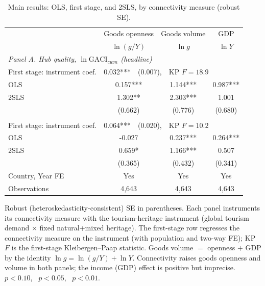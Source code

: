 \begin{table}[t]
\centering
\caption{Main results: OLS, first stage, and 2SLS, by connectivity measure (robust SE).}
\label{tab:main}
\begin{threeparttable}
\small
\begin{tabular}{lccc}
\toprule
 & Goods openness & Goods volume & GDP \\
 & $\ln(g/Y)$ & $\ln g$ & $\ln Y$ \\
\midrule
\multicolumn{4}{l}{\emph{Panel A. Hub quality, $\ln\mathrm{GACI}_{cwm}$ (headline)}}\\
First stage: instrument coef. & \multicolumn{3}{l}{0.032***\ \ (0.007),\ \ KP $F=18.9$} \\
OLS & 0.157*** & 1.144*** & 0.987*** \\
2SLS & 1.302** & 2.303*** & 1.001 \\
 & (0.662) & (0.776) & (0.680) \\
\addlinespace
\multicolumn{4}{l}{\emph{Panel B. Total connectivity, $\ln\mathrm{GACI}_{sum}$}}\\
First stage: instrument coef. & \multicolumn{3}{l}{0.064***\ \ (0.020),\ \ KP $F=10.2$} \\
OLS & -0.027 & 0.237*** & 0.264*** \\
2SLS & 0.659* & 1.166*** & 0.507 \\
 & (0.365) & (0.432) & (0.341) \\
\midrule
Country, Year FE & Yes & Yes & Yes \\
Observations & 4{,}643 & 4{,}643 & 4{,}643 \\
\bottomrule
\end{tabular}
\begin{tablenotes}\footnotesize
\item Robust (heteroskedasticity-consistent) SE in parentheses. Each panel instruments its connectivity measure with the tourism-heritage instrument (global tourism demand $\times$ fixed natural+mixed heritage). The first-stage row regresses the connectivity measure on the instrument (with population and two-way FE); KP $F$ is the first-stage Kleibergen--Paap statistic. Goods volume $=$ openness $+$ GDP by the identity $\ln g=\ln(g/Y)+\ln Y$. Connectivity raises goods openness and volume in both panels; the income (GDP) effect is positive but imprecise. \sym{*}~$p<0.10$, \sym{**}~$p<0.05$, \sym{***}~$p<0.01$.
\end{tablenotes}
\end{threeparttable}
\end{table}